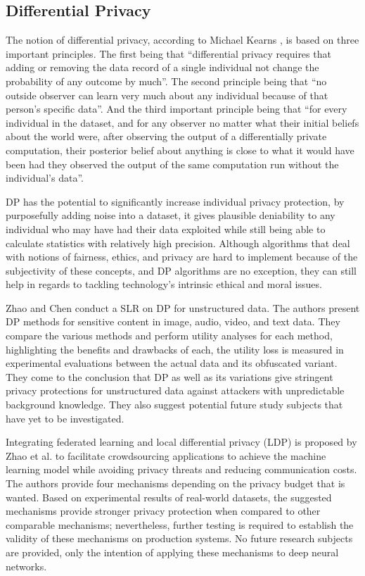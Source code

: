 \subsection{Differential Privacy}

The notion of differential privacy, according to Michael Kearns \cite{kearns2019ethical},
is based on three important principles. The first being that ``differential
privacy requires that adding or removing the data record of a single individual
not change the probability of any outcome by much''. The second principle
being that ``no outside observer can learn very much about any individual
because of that person's specific data''. And the third important principle
being that ``for every individual in the dataset, and for any observer no
matter what their initial beliefs about the world were, after observing
the output of a differentially private computation, their posterior belief
about anything is close to what it would have been had they observed the
output of the same computation run without the individual's data''.

DP has the potential to significantly increase individual
privacy protection, by purposefully adding noise into a dataset, it gives
plausible deniability to any individual who may have had their data exploited
while still being able to calculate statistics with relatively high precision.
Although algorithms that deal with notions of fairness, ethics, and privacy
are hard to implement because of the subjectivity of these concepts, and
DP algorithms are no exception, they can still help in
regards to tackling technology's intrinsic ethical and moral issues.

Zhao and Chen \cite{ZhaoSurvey} conduct a SLR on DP for
unstructured data. The authors present DP methods for
sensitive content in image, audio, video, and text data. They compare the
various methods and perform utility analyses for each method, highlighting
the benefits and drawbacks of each, the utility loss is measured in experimental
evaluations between the actual data and its obfuscated variant. They come
to the conclusion that DP as well as its variations give
stringent privacy protections for unstructured data against attackers with
unpredictable background knowledge. They also suggest potential future study
subjects that have yet to be investigated.

Integrating federated learning and local differential privacy (LDP) is proposed
by Zhao et al. \cite{zhao2020local} to facilitate crowdsourcing applications to
achieve the machine learning model while avoiding privacy threats and reducing
communication costs. The authors provide four mechanisms depending on the
privacy budget that is wanted. Based on experimental results of real-world
datasets, the suggested mechanisms provide stronger privacy protection when
compared to other comparable mechanisms; nevertheless, further testing is
required to establish the validity of these mechanisms on production systems.
No future research subjects are provided, only the intention of applying
these mechanisms to deep neural networks.

